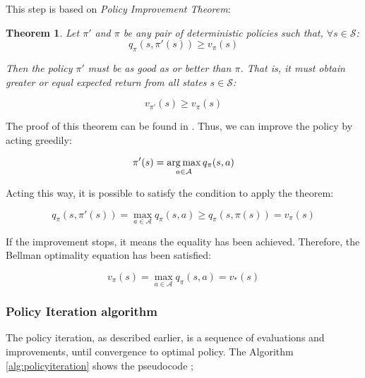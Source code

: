 This step is based on \textit{Policy Improvement Theorem}:

\newtheorem{policyimprovement}{Theorem}

\begin{policyimprovement}
	Let $\pi'$ and $\pi$ be any pair of deterministic policies such that, $\forall s \in \mathcal{S}$:
	\begin{equation}
	q_{\pi}(s, \pi'(s)) \geq v_{\pi}(s)
	\end{equation}
	
	Then the policy $\pi'$ must be as good as or better than $\pi$. That is, it must obtain greater or equal expected return from all states $s \in \mathcal{S}$:
	
	\begin{equation}
	v_{\pi'}(s) \geq v_{\pi}(s)
	\end{equation}
\end{policyimprovement}

The proof of this theorem can be found in \cite{sutton1998rli}. Thus, we can improve the policy by acting greedily:

\begin{equation}
\pi'(s) = \operatorname*{arg\,max}_{a \in \mathcal{A}} q_{\pi}(s,a)
\end{equation}

Acting this way, it is possible to satisfy the condition to apply the theorem:

\begin{equation}
q_{\pi}(s,\pi'(s)) = \max_{a \in \mathcal{A}}q_{\pi}(s,a) \geq q_{\pi}(s, \pi(s)) = v_{\pi}(s)
\end{equation}

If the improvement stops, it means the equality has been achieved. Therefore, the Bellman optimality equation has been satisfied:

\begin{equation}
v_{\pi}(s) = \max_{a \in \mathcal{A}} q_{\pi}(s, a) = v_{*}(s)
\end{equation}

\subsubsection{Policy Iteration algorithm}

The policy iteration, as described earlier, is a sequence of evaluations and improvements, until convergence to optimal policy. The Algorithm \ref{alg:policyiteration} shows the pseudocode \cite{sutton1998rli};

